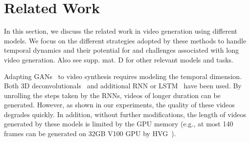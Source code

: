 \section{Related Work}



In this section, we discuss the related work in video generation using different models. 
We focus on the different strategies adopted by these methods to handle temporal dynamics and their potential for and challenges associated with long video generation. Also see supp. mat. D for other relevant models and tasks.

 Adapting GANs~\cite{karras2019style,karras2020analyzing,goodfellow2014generative} to video synthesis requires modeling the temporal dimension. Both 3D deconvolutionals~\cite{vondrick2016generating} and additional RNN or LSTM~\cite{saito2017temporal,Tulyakov_2018_CVPR,Tulyakov_2018_CVPR,clark2019adversarial,saito2020train,munoz2021temporal,tian2021a} have been used. By unrolling the steps taken by the RNNs, videos of longer duration can be generated. However, as shown in our experiments, the quality of these videos degrades quickly. 
In addition, without further modifications, the length of videos generated by these models is limited by the GPU memory (e.g., at most 140 frames can be generated on 32GB V100 GPU by HVG~\cite{castrejon2021hierarchical}).

